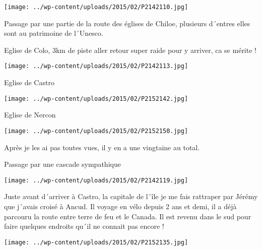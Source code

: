  

\begin{center} \texttt{[image: ../wp-content/uploads/2015/02/P2142110.jpg]} \end{center}



 Passage par une partie de la route des églises de Chiloe, plusieurs d´entres elles sont au patrimoine de l´Unesco.

 Eglise de Colo, 3km de piste aller retour super raide pour y arriver, ca se mérite !

 

\begin{center} \texttt{[image: ../wp-content/uploads/2015/02/P2142113.jpg]} \end{center}



 Eglise de Castro

 

\begin{center} \texttt{[image: ../wp-content/uploads/2015/02/P2152142.jpg]} \end{center}



 Eglise de Nercon

 

\begin{center} \texttt{[image: ../wp-content/uploads/2015/02/P2152150.jpg]} \end{center}



 Après je les ai pas toutes vues, il y en a une vingtaine au total.

 Passage par une cascade sympathique

 

\begin{center} \texttt{[image: ../wp-content/uploads/2015/02/P2142119.jpg]} \end{center}



 Juste avant d´arriver à Castro, la capitale de l´île je me fais rattraper par Jérémy que j´avais croisé à Ancud. Il voyage en vélo depuis 2 ans et demi, il a déjà parcouru la route entre terre de feu et le Canada. Il est revenu dans le sud pour faire quelques endroits qu´il ne connait pas encore !

 

\begin{center} \texttt{[image: ../wp-content/uploads/2015/02/P2152135.jpg]} \end{center}



